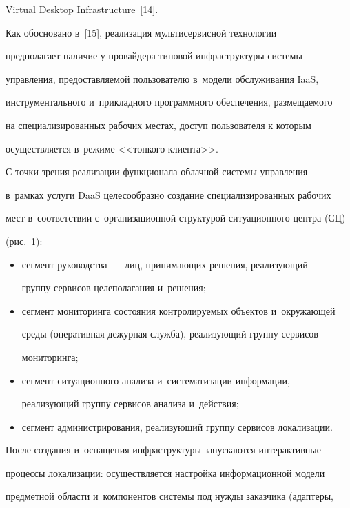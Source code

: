 Virtual Desktop Infrastructure~[14].

  

  Как обосновано в~[15], реализация мультисервисной технологии 

предполагает наличие у провайдера типовой инфраструктуры системы 

управления, предоставляемой пользователю в~модели обслуживания IaaS, 

инструментального и~прикладного программного обеспечения, размещаемого 

на специализированных рабочих местах, доступ пользователя к которым 

осуществляется в~режиме <<тонкого клиента>>.

  

  С точки зрения реализации функционала облачной системы управления 

в~рамках услуги DaaS целесообразно создание специализированных рабочих 

мест в~соответствии с~организационной структурой ситуационного центра (СЦ)

(рис.~1):

  \begin{itemize}

\item сегмент руководства~--- лиц, принимающих решения, реализующий 

группу сервисов целеполагания и~решения; 

\item сегмент мониторинга состояния контролируемых объектов и~окружающей 

среды (оперативная дежурная служба), реализующий группу сервисов 

мониторинга; 

\item сегмент ситуационного анализа и~систематизации информации, 

реализующий группу сервисов анализа и~действия;

\item сегмент администрирования, реализующий группу сервисов локализации.

\end{itemize}



  После создания и~оснащения инфраструктуры запускаются интерактивные 

процессы локализации: осуществляется настройка информационной модели 

предметной области и~компонентов системы под нужды заказчика (адаптеры, 

